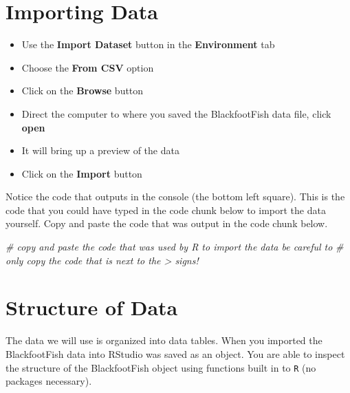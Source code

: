 \documentclass[]{article}
\newenvironment{Shaded}{\begin{snugshade}}{\end{snugshade}}
\newcommand{\CommentTok}[1]{\textcolor[rgb]{0.56,0.35,0.01}{\textit{#1}}}
\providecommand{\tightlist}{%
  \setlength{\itemsep}{0pt}\setlength{\parskip}{0pt}}
\begin{document}
\newpage

\section{Importing Data}\label{importing-data}

\begin{itemize}
\tightlist
\item
  Use the \textbf{Import Dataset} button in the \textbf{Environment}
  tab\\
\item
  Choose the \textbf{From CSV} option\\
\item
  Click on the \textbf{Browse} button\\
\item
  Direct the computer to where you saved the BlackfootFish data file,
  click \textbf{open}\\
\item
  It will bring up a preview of the data\\
\item
  Click on the \textbf{Import} button
\end{itemize}

Notice the code that outputs in the console (the bottom left square).
This is the code that you could have typed in the code chunk below to
import the data yourself. Copy and paste the code that was output in the
code chunk below.

\vspace{0.5cm}

\begin{Shaded}
\begin{Highlighting}[]
\CommentTok{# copy and paste the code that was used by R to import the data be careful to}
\CommentTok{# only copy the code that is next to the > signs!}
\end{Highlighting}
\end{Shaded}

\section{Structure of Data}\label{structure-of-data}

The data we will use is organized into data tables. When you imported
the BlackfootFish data into RStudio was saved as an object. You are able
to inspect the structure of the BlackfootFish object using functions
built in to \texttt{R} (no packages necessary).
\end{document}
